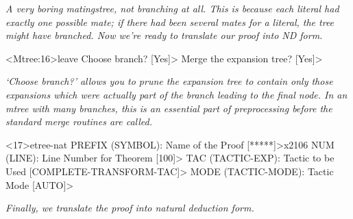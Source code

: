 \begin{tpsexample}
{\it A very boring matingstree, not branching at all. This is because each literal
had exactly one possible mate; if there had been several mates for a literal, the
tree might have branched. Now we're ready to translate our proof into ND form.}

<Mtree:16>leave
Choose branch? [Yes]>
Merge the expansion tree? [Yes]>

{\it `Choose branch?' allows you to prune the expansion tree to contain only those
expansions which were actually part of the branch leading to the final node. In an
mtree with many branches, this is an essential part of preprocessing before the
standard merge routines are called.}

<17>etree-nat
PREFIX (SYMBOL): Name of the Proof [*****]>x2106
NUM (LINE): Line Number for Theorem [100]>
TAC (TACTIC-EXP): Tactic to be Used [COMPLETE-TRANSFORM-TAC]>
MODE (TACTIC-MODE): Tactic Mode [AUTO]>

{\it Finally, we translate the proof into natural deduction form.}
\end{tpsexample}
